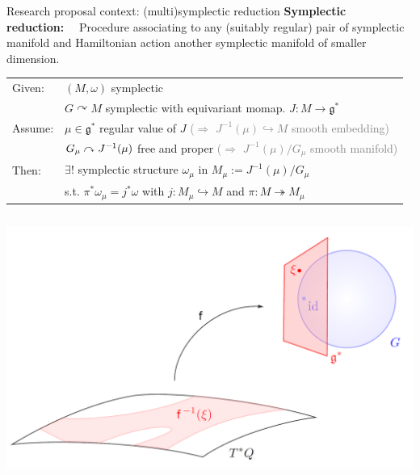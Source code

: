 \documentclass[beamer,10pt]{standalone}
\begin{document}
\begin{frame}{Research proposal context: (multi)symplectic reduction}
	\textbf{\color{UniGreen}Symplectic reduction:}~~
	Procedure associating to any (suitably regular) pair of symplectic manifold and Hamiltonian action another symplectic manifold of smaller dimension.
	\vfill
	\pause
	\begin{thmblock}
		\vspace{-.4em}
		\begin{tabular}{l p{12cm}}
		    Given: & $(M,\omega)$ symplectic
		    \\
		    & $G\curvearrowright M$ symplectic with equivariant momap. $J:M\to \mathfrak{g}^*$
		    \\[.2em]
		    Assume: & $\mu \in \mathfrak{g}^*$ regular value of $J$ 
		    \qquad\quad \footnotesize \textcolor{gray}{($\Rightarrow$ $J^{-1}(\mu)\hookrightarrow M$ smooth embedding)}
		    \\
			& $G_\mu\curvearrowright J^{-1}(\mu)$ free and proper
			\quad \footnotesize \textcolor{gray}{($\Rightarrow$ $J^{-1}(\mu)/G_\mu$ smooth manifold)}
			\\[.4em]
			Then: & $\exists!$ symplectic structure $\omega_\mu$ in $M_\mu:= J^{-1}(\mu)/G_\mu$ \\
			& s.t. $\pi^\ast \omega_\mu = j^\ast \omega$ with $j:M_\mu \hookrightarrow M$ and $\pi:M\twoheadrightarrow M_\mu$
		\end{tabular}
		\vspace{-.4em}
	\end{thmblock}
	\vfill
	\pause
	\begin{columns}
		\begin{column}{0.40\textwidth}
			\includegraphics[width=\textwidth]{Pictures/Reduction}
		\end{column}	
		

\end{columns}
\end{frame}
\end{document}
